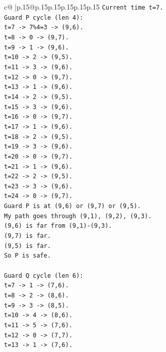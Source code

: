 \documentclass{article}
\begin{document}
{\begin{supertabular}{c@{$\;$}|p{.15\linewidth}@{}p{.15\linewidth}p{.15\linewidth}p{.15\linewidth}p{.15\linewidth}p{.15\linewidth}}
{{{\texttt{Current time t=7.} \\
\texttt{Guard P cycle (len 4):} \\
\texttt{t=7 {-}> 7\%4=3 {-}> (9,6).} \\
\texttt{t=8 {-}> 0 {-}> (9,7).} \\
\texttt{t=9 {-}> 1 {-}> (9,6).} \\
\texttt{t=10 {-}> 2 {-}> (9,5).} \\
\texttt{t=11 {-}> 3 {-}> (9,6).} \\
\texttt{t=12 {-}> 0 {-}> (9,7).} \\
\texttt{t=13 {-}> 1 {-}> (9,6).} \\
\texttt{t=14 {-}> 2 {-}> (9,5).} \\
\texttt{t=15 {-}> 3 {-}> (9,6).} \\
\texttt{t=16 {-}> 0 {-}> (9,7).} \\
\texttt{t=17 {-}> 1 {-}> (9,6).} \\
\texttt{t=18 {-}> 2 {-}> (9,5).} \\
\texttt{t=19 {-}> 3 {-}> (9,6).} \\
\texttt{t=20 {-}> 0 {-}> (9,7).} \\
\texttt{t=21 {-}> 1 {-}> (9,6).} \\
\texttt{t=22 {-}> 2 {-}> (9,5).} \\
\texttt{t=23 {-}> 3 {-}> (9,6).} \\
\texttt{t=24 {-}> 0 {-}> (9,7).} \\
\texttt{Guard P is at (9,6) or (9,7) or (9,5).} \\
\texttt{My path goes through (9,1), (9,2), (9,3).} \\
\texttt{(9,6) is far from (9,1){-}(9,3).} \\
\texttt{(9,7) is far.} \\
\texttt{(9,5) is far.} \\
\texttt{So P is safe.} \\
\\ 
\texttt{Guard Q cycle (len 6):} \\
\texttt{t=7 {-}> 1 {-}> (7,6).} \\
\texttt{t=8 {-}> 2 {-}> (8,6).} \\
\texttt{t=9 {-}> 3 {-}> (8,5).} \\
\texttt{t=10 {-}> 4 {-}> (8,6).} \\
\texttt{t=11 {-}> 5 {-}> (7,6).} \\
\texttt{t=12 {-}> 0 {-}> (7,7).} \\
\texttt{t=13 {-}> 1 {-}> (7,6).} \\
}}}
\end{supertabular}}
\end{document}
